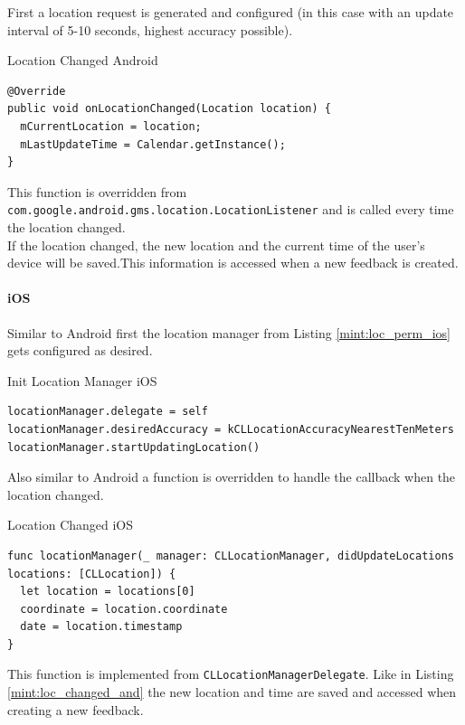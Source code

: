First a location request is generated and configured (in this case with an update interval of 5-10 seconds, highest accuracy possible).

\begin{listing}[H]
  \caption{Location Changed Android}
  \label{mint:loc_changed_and}
    \begin{verbatim}
@Override
public void onLocationChanged(Location location) {
  mCurrentLocation = location;
  mLastUpdateTime = Calendar.getInstance();
}
    \end{verbatim}
\end{listing}

This function is overridden from \texttt{com.google.android.gms.location.LocationListener} and is called every time the location changed.\\
If the location changed, the new location and the current time of the user's device will be saved.This information is accessed when a new feedback is created.

\paragraph{iOS}
Similar to Android first the location manager from Listing \ref{mint:loc_perm_ios} gets configured as desired.
\begin{listing}[H]
  \caption{Init Location Manager iOS}
  \label{mint:loc_mgr_ios}
    \begin{verbatim}
locationManager.delegate = self
locationManager.desiredAccuracy = kCLLocationAccuracyNearestTenMeters
locationManager.startUpdatingLocation()
    \end{verbatim}
\end{listing}

Also similar to Android a function is overridden to handle the callback when the location changed.
\begin{listing}[H]
  \caption{Location Changed iOS}
  \label{mint:loc_changed_ios}
    \begin{verbatim}
func locationManager(_ manager: CLLocationManager, didUpdateLocations locations: [CLLocation]) {
  let location = locations[0]
  coordinate = location.coordinate
  date = location.timestamp
}
    \end{verbatim}
\end{listing}
This function is implemented from \texttt{CLLocationManagerDelegate}. Like in Listing \ref{mint:loc_changed_and} the new location and time are saved and accessed when creating a new feedback.

